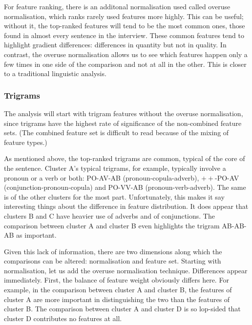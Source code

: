 For feature ranking, there is an additonal normalisation used
called overuse normalisation, which ranks rarely used features more
highly.  This can be useful; without it, the top-ranked features will
tend to be the most common ones, those found in almost every sentence
in the interview. These common features tend to highlight
gradient differences: differences in quantity but not in quality. In contrast,
the overuse normalisation allows us to see which features happen only
a few times in one side of the comparison and not at all in the
other. This is closer to a traditional linguistic analysis.


\subsubsection{Trigrams}

The analysis will start with trigram features without the overuse
normalisation, since trigrams have the highest rate of significance of
the non-combined feature sets. (The combined feature set is difficult
to read because of the mixing of feature types.)

As mentioned above, the top-ranked trigrams are common, typical
of the core of the sentence. Cluster A's typical trigrams, for
example, typically involve a pronoun or a verb or both: PO-AV-AB
(pronoun-copula-adverb), $++$-PO-AV (conjunction-pronoun-copula) and
PO-VV-AB (pronoun-verb-adverb). The same is of the
other clusters for the most part. Unfortunately, this makes it say
interesting things about the difference in feature distribution. It
does appear that clusters B and C have heavier use of adverbs and of
conjunctions. The comparison between cluster A and cluster B even
highlights the trigram AB-AB-AB as important.

Given this lack of information, there are two dimensions along which
the comparisons can be altered: normalisation and feature
set. Starting with normalisation, let us add the overuse normalisation
technique. Differences appear immediately. First, the balance of
feature weight obviously differs here. For example, in the comparison
between cluster A and cluster B, the features of cluster A are more
important in distinguishing the two than the features of cluster
B. The comparison between cluster A and cluster D is so lop-sided that
cluster D contributes no features at all.


